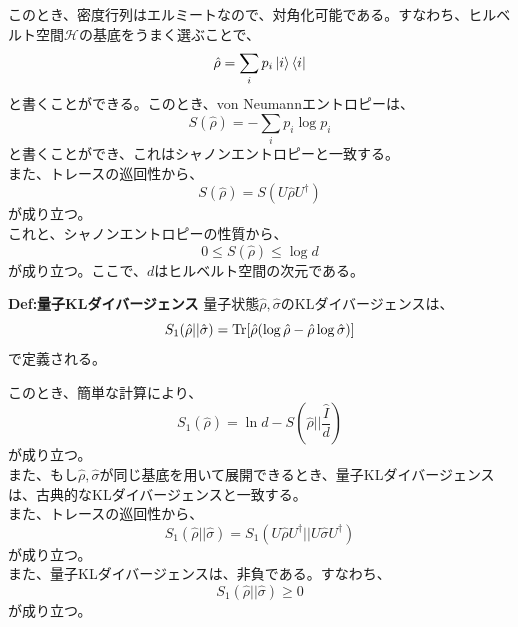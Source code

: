 \documentclass[a4paper,11pt]{jsarticle}
\numberwithin{equation}{section}
\begin{document}
このとき、密度行列はエルミートなので、対角化可能である。すなわち、ヒルベルト空間$\mathcal{H}$の基底をうまく選ぶことで、
\begin{equation}
    \hat{\rho} = \sum_{i} p_i \ket{i}\bra{i}
\end{equation}
と書くことができる。このとき、von Neumannエントロピーは、
\begin{equation}
    S(\hat{\rho}) = -\sum_{i} p_i \log p_i
\end{equation}
と書くことができ、これはシャノンエントロピーと一致する。\\
また、トレースの巡回性から、
\begin{equation}
    S(\hat{\rho}) = S(U\hat{\rho}U^{\dagger})
\end{equation}
が成り立つ。\\
これと、シャノンエントロピーの性質から、
\begin{equation}
    0 \leq S(\hat{\rho}) \leq \log d
\end{equation}
が成り立つ。ここで、$d$はヒルベルト空間の次元である。\\

\begin{itembox}[l]{\textbf{Def:量子KLダイバージェンス}}
    量子状態$\hat{\rho},\hat{\sigma}$のKLダイバージェンスは、
    \begin{equation}
        S_1(\hat{\rho}||\hat{\sigma}) = \Trace[\hat{\rho}(\log \hat{\rho} - \hat{\rho}\log \hat{\sigma})]
    \end{equation}
    で定義される。
\end{itembox}
このとき、簡単な計算により、
\begin{equation}
    S_1(\hat{\rho}) =\ln d - S(\hat{\rho}||{\frac{\hat{{I}}}{d}})
\end{equation}
が成り立つ。\\
また、もし$\hat{\rho},\hat{\sigma}$が同じ基底を用いて展開できるとき、量子KLダイバージェンスは、古典的なKLダイバージェンスと一致する。\\
また、トレースの巡回性から、
\begin{equation}
    S_1(\hat{\rho}||\hat{\sigma}) = S_1(U\hat{\rho}U^{\dagger}||U\hat{\sigma}U^{\dagger})
\end{equation}
が成り立つ。\\
また、量子KLダイバージェンスは、非負である。すなわち、
\begin{equation}
    S_1(\hat{\rho}||\hat{\sigma}) \geq 0
\end{equation}
が成り立つ。\\
\end{document}
